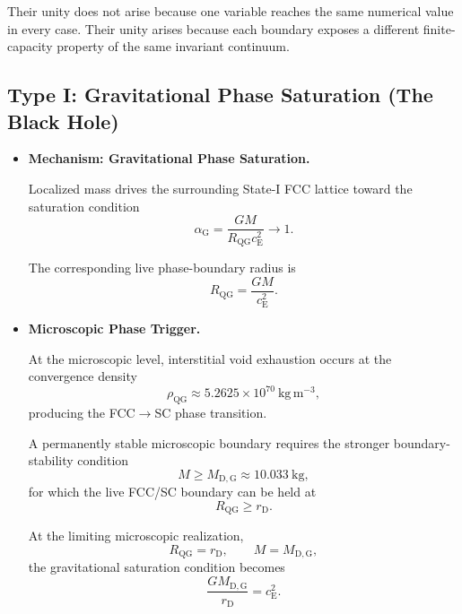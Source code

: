 Their unity does not arise because one variable reaches the same numerical value in every case. Their unity arises because each boundary exposes a different finite-capacity property of the same invariant continuum.


\subsection{Type I: Gravitational Phase Saturation (The Black Hole)}

\begin{itemize}

    \item \textbf{Mechanism: Gravitational Phase Saturation.}

    Localized mass drives the surrounding State-I FCC lattice toward the saturation condition
    \begin{equation}
        \alpha_{\mathrm G}
        =
        \frac{GM}
        {R_{\mathrm{QG}}c_{\mathrm E}^2}
        \rightarrow
        1.
    \end{equation}

    The corresponding live phase-boundary radius is
    \begin{equation}
        R_{\mathrm{QG}}
        =
        \frac{GM}{c_{\mathrm E}^2}.
    \end{equation}

    \item \textbf{Microscopic Phase Trigger.}

    At the microscopic level, interstitial void exhaustion occurs at the convergence density
    \begin{equation}
        \rho_{\mathrm{QG}}
        \approx
        5.2625\times10^{70}\ \mathrm{kg\,m^{-3}},
    \end{equation}
    producing the FCC$\rightarrow$SC phase transition.

    A permanently stable microscopic boundary requires the stronger boundary-stability condition
    \begin{equation}
        M
        \geq
        M_{\mathrm{D,G}}
        \approx
        10.033\ \mathrm{kg},
    \end{equation}
    for which the live FCC/SC boundary can be held at
    \begin{equation}
        R_{\mathrm{QG}}
        \geq
        r_{\mathrm D}.
    \end{equation}

    At the limiting microscopic realization,
    \begin{equation}
        R_{\mathrm{QG}}
        =
        r_{\mathrm D},
        \qquad
        M
        =
        M_{\mathrm{D,G}},
    \end{equation}
    the gravitational saturation condition becomes
    \begin{equation}
        \frac{
            G M_{\mathrm{D,G}}
        }{
            r_{\mathrm D}
        }
        =
        c_{\mathrm E}^2.
    \end{equation}


\end{itemize}
